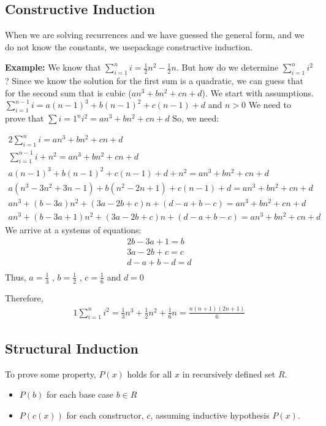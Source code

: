 \documentclass{article}
\begin{document}
\subsection{Constructive Induction}
When we are solving recurrences and we have guessed the general form, and we do not know the constants, we usepackage
constructive induction.

\textbf{Example:}
We know that $ \sum_{i=1}^{n} i = \frac{1}{2}n^2 - \frac{1}{2}n$. But how do we determine $ \sum_{i=1}^{n} i^2 $?
Since we know the solution for the first sum is a quadratic, we can guess that for the second sum that is cubic 
($an^3 + bn^2 + cn + d$).
We start with assumptions. $\sum_{i=1}^{n-1} i = a(n-1)^3 + b(n-1)^2 + c(n-1) + d$ and $ n > 0 $
We need to prove that $\sum i = 1^ni^2 = an^3 + bn^2 + cn + d$
So, we need:

\begin{alignat*}{2}
  \sum_{i=1}^{n} i = an^3 + bn^2 + cn + d \\
  \sum_{i=1}^{n-1} i + n^2 = an^3 + bn^2 + cn + d \\
  a(n-1)^3 + b(n-1)^2 + c(n-1) + d + n^2 = an^3 + bn^2 + cn + d \\
  a(n^3-3n^2+3n-1) + b(n^2-2n+1) + c(n-1) + d = an^3 + bn^2 + cn + d \\
  an^3 + (b-3a)n^2 + (3a-2b+c)n + (d-a+b-c) = an^3 + bn^2 + cn + d \\  
  an^3 + (b-3a+1)n^2 + (3a-2b+c)n+(d-a+b-c) = an^3 + bn^2 + cn + d
\end{alignat*}
We arrive at a systems of equations:
\begin{alignat*}{2}
  b-3a+1 = b \\
  3a-2b+c = c \\
  d-a+b-d = d \\
\end{alignat*}
Thus, $ a = \frac{1}{3} $ , $ b=\frac{1}{2} $ , $ c=\frac{1}{6} $ and $ d = 0 $

Therefore, 
\begin{alignat*}{1}
  \sum_{i=1}^{n} i^2 = \frac{1}{3}n^3 + \frac{1}{2}n^2 + \frac{1}{6}n = \frac{n(n+1)(2n+1)}{6}
\end{alignat*}

\subsection{Structural Induction}
To prove some property, $ P(x) $ holds for all $ x $ in recursively defined set $ R $.
\begin{itemize}
  \item $ P(b) $ for each base case $ b \in R $
  \item $ P(c(x)) $ for each constructor, $ c $, assuming inductive hypothesis $ P(x) $.
\end{itemize}
\end{document}
